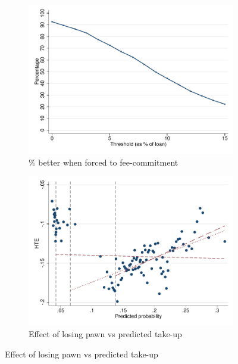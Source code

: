 \documentclass[oneside,11pt]{article}
\begin{document}
\begin{figure}[H]
\begin{center}
\begin{subfigure}{0.45\textwidth}
    \end{subfigure}
        \begin{subfigure}{0.45\textwidth}
        \caption{\% better when forced to fee-commitment}
        \centering
        \includegraphics[width=\textwidth]{Figuras/line_better_forceall_fc_te_cf.pdf}
        
    \end{subfigure}
        \begin{subfigure}{0.45\textwidth}
        \caption{\footnotesize{Effect of losing pawn vs predicted take-up}}
        \centering
        \includegraphics[width=\textwidth]{Figuras/takeuppr_def.pdf}
    \end{subfigure}
    

\end{center}
\end{figure}
\end{document}
